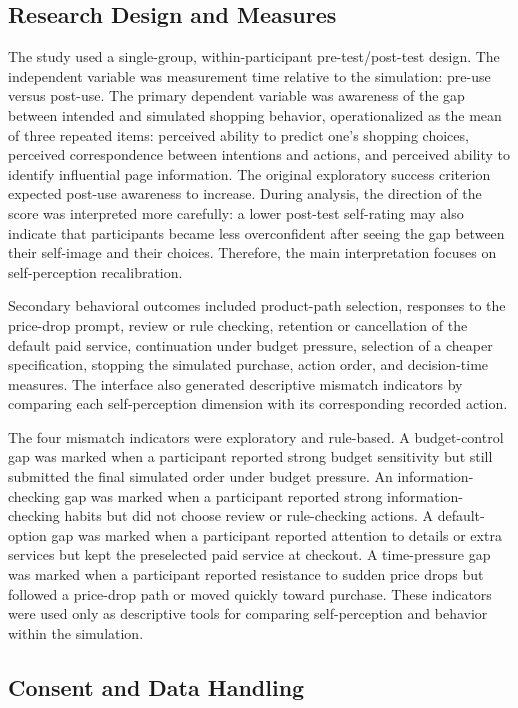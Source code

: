 \documentclass[stu,12pt,floatsintext]{apa7}
\begin{document}
\subsection{Research Design and Measures}

The study used a single-group, within-participant pre-test/post-test design. The independent variable was measurement time relative to the simulation: pre-use versus post-use. The primary dependent variable was awareness of the gap between intended and simulated shopping behavior, operationalized as the mean of three repeated items: perceived ability to predict one's shopping choices, perceived correspondence between intentions and actions, and perceived ability to identify influential page information. The original exploratory success criterion expected post-use awareness to increase. During analysis, the direction of the score was interpreted more carefully: a lower post-test self-rating may also indicate that participants became less overconfident after seeing the gap between their self-image and their choices. Therefore, the main interpretation focuses on self-perception recalibration.

Secondary behavioral outcomes included product-path selection, responses to the price-drop prompt, review or rule checking, retention or cancellation of the default paid service, continuation under budget pressure, selection of a cheaper specification, stopping the simulated purchase, action order, and decision-time measures. The interface also generated descriptive mismatch indicators by comparing each self-perception dimension with its corresponding recorded action.

The four mismatch indicators were exploratory and rule-based. A budget-control gap was marked when a participant reported strong budget sensitivity but still submitted the final simulated order under budget pressure. An information-checking gap was marked when a participant reported strong information-checking habits but did not choose review or rule-checking actions. A default-option gap was marked when a participant reported attention to details or extra services but kept the preselected paid service at checkout. A time-pressure gap was marked when a participant reported resistance to sudden price drops but followed a price-drop path or moved quickly toward purchase. These indicators were used only as descriptive tools for comparing self-perception and behavior within the simulation.

\subsection{Consent and Data Handling}
\end{document}
